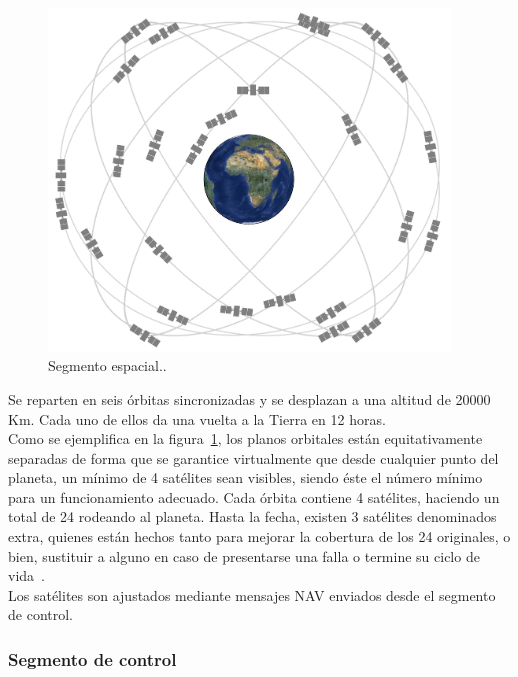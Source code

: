 \begin{figure}[H]
\centering
\includegraphics[width=0.95\textwidth]{Figures/constel}
\caption[Segmento espacial.]{Segmento espacial.\footnotemark.}
\label{fig:segEs}
\end{figure}


Se reparten en seis órbitas sincronizadas y se desplazan a una altitud de 20000 Km. Cada uno de ellos da una vuelta a la Tierra en 12 horas. \\

Como se ejemplifica en la figura~\ref{fig:segEs}, los planos orbitales están equitativamente separadas de forma que se garantice virtualmente que desde cualquier punto del planeta, un mínimo de 4 satélites sean visibles, siendo éste el número mínimo para un funcionamiento adecuado. Cada órbita contiene 4 satélites, haciendo un total de 24 rodeando al planeta. Hasta la fecha, existen 3 satélites denominados extra, quienes están hechos tanto para mejorar la cobertura de los 24 originales, o bien, sustituir a alguno en caso de presentarse una falla o termine su ciclo de vida~\citep{gps_gov}.\\

Los satélites son ajustados mediante mensajes NAV enviados desde el segmento de control.

\subsubsection{Segmento de control}


